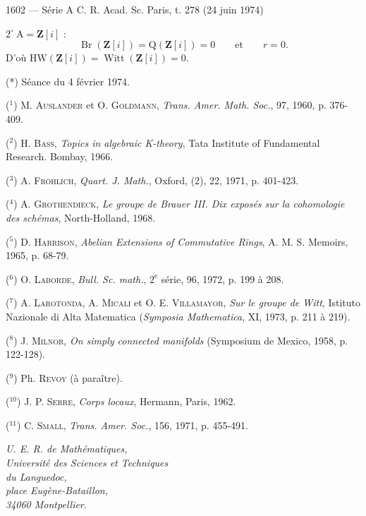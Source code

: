 1602 --- Série A \hfill C. R. Acad. Sc. Paris, t. 278 (24 juin 1974)


$2^\circ\ \mathrm{A}=\mathbf{Z}[i]$ :
\[
\operatorname{Br}(\mathbf{Z}[i])=\mathrm{Q}(\mathbf{Z}[i])=0\qquad\text{et}\qquad r=0.
\]
D'où $\mathrm{HW}(\mathbf{Z}[i])=\operatorname{Witt}(\mathbf{Z}[i])=0$.

(*) Séance du 4 février 1974.

(${}^1$) M. \textsc{Auslander} et O. \textsc{Goldmann}, \textit{Trans. Amer. Math. Soc.}, 97, 1960, p. 376-409.

(${}^2$) H. \textsc{Bass}, \textit{Topics in algebraic K-theory}, Tata Institute of Fundamental Research. Bombay, 1966.

(${}^3$) A. \textsc{Fröhlich}, \textit{Quart. J. Math.}, Oxford, (2), 22, 1971, p. 401-423.

(${}^4$) A. \textsc{Grothendieck}, \textit{Le groupe de Brauer III. Dix exposés sur la cohomologie des schémas}, North-Holland, 1968.

(${}^5$) D. \textsc{Harrison}, \textit{Abelian Extensions of Commutative Rings}, A. M. S. Memoirs, 1965, p. 68-79.

(${}^6$) O. \textsc{Laborde}, \textit{Bull. Sc. math.}, $2^{\mathrm e}$ série, 96, 1972, p. 199 à 208.

(${}^7$) A. \textsc{Larotonda}, A. \textsc{Micali} et O. E. \textsc{Villamayor}, \textit{Sur le groupe de Witt}, Istituto Nazionale di Alta Matematica (\textit{Symposia Mathematica}, XI, 1973, p. 211 à 219).

(${}^8$) J. \textsc{Milnor}, \textit{On simply connected manifolds} (Symposium de Mexico, 1958, p. 122-128).

(${}^9$) Ph. \textsc{Revoy} (à paraître).

(${}^{10}$) J. P. \textsc{Serre}, \textit{Corps locaux}, Hermann, Paris, 1962.

(${}^{11}$) C. \textsc{Small}, \textit{Trans. Amer. Soc.}, 156, 1971, p. 455-491.

\begin{flushright}
\textit{U. E. R. de Mathématiques,\\
Université des Sciences et Techniques\\
du Languedoc,\\
place Eugène-Bataillon,\\
34060 Montpellier.}
\end{flushright}

